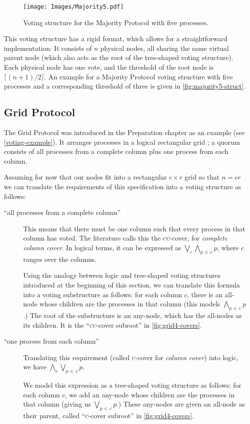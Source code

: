 \documentclass[11pt,chapterprefix=true,toc=bibliography,numbers=noendperiod,
               footnotes=multiple,twoside]{scrreprt}
\begin{document}
\begin{figure}[h]
    \centering
    \texttt{[image: Images/Majority5.pdf]}
    \caption{Voting structure for the Majority Protocol with five processes.}
    \label{fig:majority5-struct}
\end{figure}

This voting structure has a rigid format, which allows for a straightforward implementation: It consists of \(n\) physical nodes, all sharing the same virtual parent node (which also acts as the root of the tree-shaped voting structure). Each physical node has one vote, and the threshold of the root node is \(\lceil (n + 1) / 2 \rceil\). An example for a Majority Protocol voting structure with five processes and a corresponding threshold of three is given in \autoref{fig:majority5-struct}.

\subsection{Grid Protocol}

The Grid Protocol was introduced in the Preparation chapter as an example (see \autoref{voting-example}). It arranges processes in a logical rectangular grid \autocite{grid}; a quorum consists of all processes from a complete column plus one process from each column.

Assuming for now that our nodes fit into a rectangular \(c \times r\) grid so that \(n = c r\) we can translate the requirements of this specification into a voting structure as follows:

\begin{description}
    \item[\enquote{all processes from a complete column}] This means that there must be one column such that every process in that column has voted. The literature calls this the \textsc{cc}-cover, for \emph{complete column cover}. In logical terms, it can be expressed as \(\bigvee_c \bigwedge_{p\,\in\,c} p \), where \(c\) ranges over the columns.

        Using the analogy between logic and tree-shaped voting structures introduced at the beginning of this section, we can translate this formula into a voting substructure as follows: for each column \(c\), there is an all-node whose children are the processes in that column (this models \(\bigwedge_{p\,\in\,c} p \).) The root of the substructure is an any-node, which has the all-nodes as its children. It is the \enquote{\textsc{cc}-cover subroot} in \autoref{fig:grid4-covers}.

    \item[\enquote{one process from each column}] Translating this requirement (called \textsc{c}-cover for \emph{column cover}) into logic, we have \(\bigwedge_c \bigvee_{p\,\in\,c} p \).

        We model this expression as a tree-shaped voting structure as follows: for each column \(c\), we add an any-node whose children are the processes in that column (giving us \(\bigvee_{p\,\in\,c} p \).) These any-nodes are given an all-node as their parent, called \enquote{\textsc{c}-cover subroot} in \autoref{fig:grid4-covers}.
\end{description}
\end{document}
